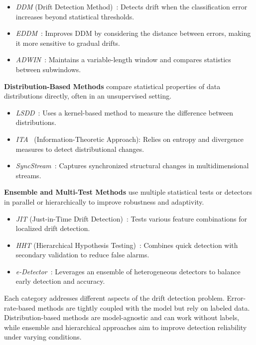 \begin{itemize}
    \item \emph{DDM} (Drift Detection Method)~\cite{ddm}: Detects drift when the
          classification error increases beyond statistical thresholds.
    \item \emph{EDDM}~\cite{eddm}: Improves DDM by considering the distance between errors,
          making it more sensitive to gradual drifts.
    \item \emph{ADWIN}~\cite{adwin}: Maintains a variable-length window and compares
          statistics between subwindows.
\end{itemize}

\textbf{Distribution-Based Methods} compare statistical properties of data distributions directly,
often in an unsupervised setting.

\begin{itemize}
    \item \emph{LSDD}~\cite{lsdd}: Uses a kernel-based method to measure the difference
          between distributions.
    \item \emph{ITA}~\cite{ita} (Information-Theoretic Approach): Relies on entropy and divergence
          measures to detect distributional changes.
    \item \emph{SyncStream}~\cite{syncstream}: Captures synchronized structural changes in multidimensional streams.
\end{itemize}

\textbf{Ensemble and Multi-Test Methods} use multiple statistical tests or detectors in parallel or
hierarchically to improve robustness and adaptivity.

\begin{itemize}
    \item \emph{JIT} (Just-in-Time Drift Detection)~\cite{jit}: Tests various feature combinations
          for localized drift detection.
    \item \emph{HHT} (Hierarchical Hypothesis Testing)~\cite{hht}: Combines quick detection with
          secondary validation to reduce false alarms.
    \item \emph{e-Detector}~\cite{e_detector}: Leverages an ensemble of heterogeneous detectors to
          balance early detection and accuracy.
\end{itemize}

Each category addresses different aspects of the drift detection problem.
Error-rate-based methods are tightly coupled with the model but rely on labeled
data. Distribution-based methods are model-agnostic and can work without
labels, while ensemble and hierarchical approaches aim to improve detection
reliability under varying conditions.

